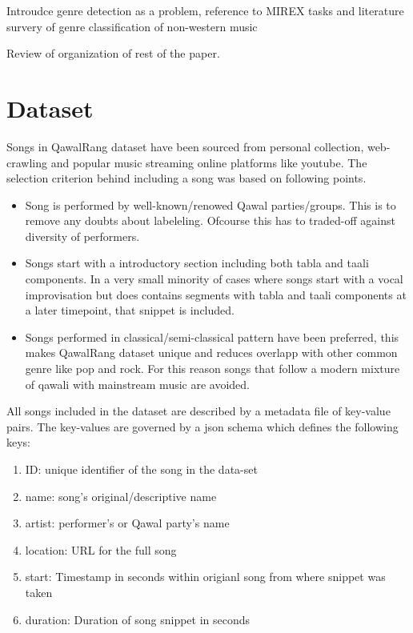 \documentclass{article}
\begin{document}
Introudce genre detection as a problem, reference to MIREX tasks and literature survery of genre classification of non-western music

Review of organization of rest of the paper.

\section{Dataset}\label{sec:data}
Songs in QawalRang dataset have been sourced from personal collection, web-crawling and popular music streaming online platforms like youtube. The selection criterion behind including a song was based on following points.
\begin{itemize}
\item Song is performed by well-known/renowed Qawal parties/groups. This is to remove any doubts about labeleling. Ofcourse this has to traded-off against diversity of performers.
\item Songs start with a introductory section including both tabla and taali components. In a very small minority of cases where songs start with a vocal improvisation but does contains segments with tabla and taali components at a later timepoint, that snippet is included.
\item Songs performed in classical/semi-classical pattern have been preferred, this makes QawalRang dataset unique and reduces overlapp with other common genre like pop and rock. For this reason songs that follow a modern mixture of qawali with mainstream music are avoided.
\end{itemize}

All songs included in the dataset are described by a metadata file of key-value pairs. The key-values are governed by a json schema which defines the following keys:
\begin{enumerate}
\item ID: unique identifier of the song in the data-set
\item name: song's original/descriptive name
\item artist: performer's or Qawal party's name
\item location: URL for the full song
\item start: Timestamp in seconds within origianl song from where snippet was taken
\item duration: Duration of song snippet in seconds
\end{enumerate}
\end{document}
